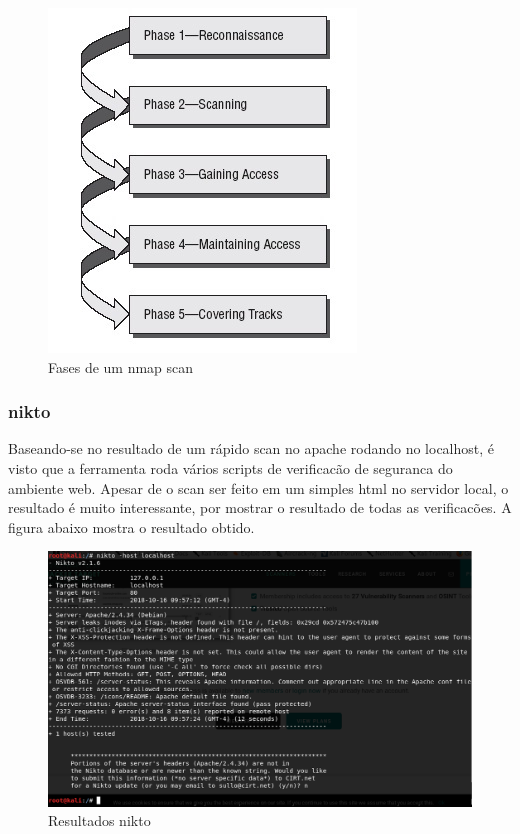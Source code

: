 \documentclass[journal]{IEEEtran}
\begin{document}
\begin{figure}[h!]
	\includegraphics[width=0.65\linewidth]{../nmap_phases_pic.jpg}
	\caption{Fases de um nmap scan}
	\label{fig:nmap_phases}
\end{figure}

\subsubsection{nikto}
Baseando-se no resultado de um rápido scan no apache rodando no localhost, é visto que a ferramenta roda vários scripts de verificacão de seguranca do ambiente web. Apesar de o scan ser feito em um simples html no servidor local, o resultado é muito interessante, por mostrar o resultado de todas as verificacões. A figura abaixo mostra o resultado obtido.

\begin{figure}[h!]
	\includegraphics[width=\linewidth]{../niktoLocalhost.png}
	\caption{Resultados nikto}
	\label{fig:nikto_results}
\end{figure}
\end{document}
